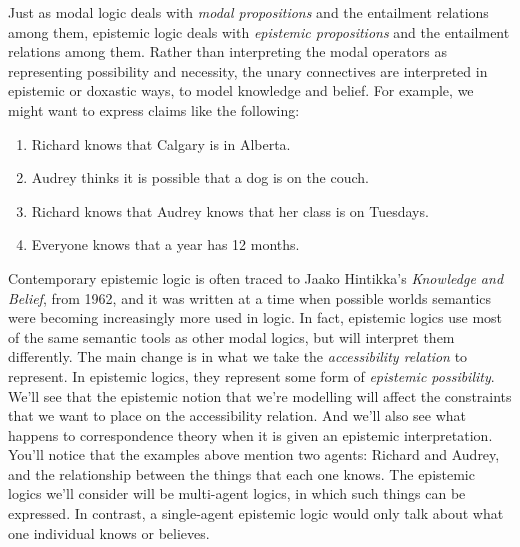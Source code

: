 \documentclass[../../../include/open-logic-section]{subfiles}
\begin{document}


Just as modal logic deals with \emph{modal propositions} and the entailment relations among them, epistemic logic deals with \emph{epistemic propositions} and the entailment relations among them. Rather than interpreting the modal operators as representing possibility and necessity, the unary connectives are interpreted in epistemic or doxastic ways, to model knowledge and belief. For example, we might want to express claims like the following:

\begin{enumerate}
\item Richard knows that Calgary is in Alberta.
\item Audrey thinks it is possible that a dog is on the couch.
\item Richard knows that Audrey knows that her class is on Tuesdays.
\item Everyone knows that a year has 12 months.
\end{enumerate}
Contemporary epistemic logic is often traced to Jaako Hintikka's \emph{Knowledge and Belief}, from 1962, and it was written at a time when possible worlds semantics were becoming increasingly more used in logic. In fact, epistemic logics use most of the same semantic tools as other modal logics, but will interpret them differently. The main change is in what we take the \emph{accessibility relation} to represent. In epistemic logics, they represent some form of \emph{epistemic possibility}. We'll see that the epistemic notion that we're modelling will affect the constraints that we want to place on the accessibility relation. And we'll also see what happens to correspondence theory when it is given an epistemic interpretation. You'll notice that the examples above mention two agents: Richard and Audrey, and the relationship between the things that each one knows. The epistemic logics we'll consider will be multi-agent logics, in which such things can be expressed. In contrast, a single-agent epistemic logic would only talk about what one individual knows or believes.
\end{document}
